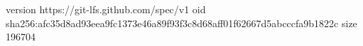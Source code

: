 version https://git-lfs.github.com/spec/v1
oid sha256:afc35d8ad93eea9fc1373e46a89f93f3c8d68aff01f62667d5abcccfa9b1822c
size 196704
